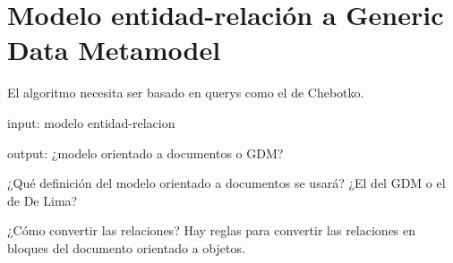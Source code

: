 \section{Modelo entidad-relación a Generic Data Metamodel}


El algoritmo necesita ser basado en querys como el de Chebotko.


input: modelo entidad-relacion


output: ¿modelo orientado a documentos o GDM?


¿Qué definición del modelo orientado a documentos se usará? ¿El del GDM o el de De Lima?


¿Cómo convertir las relaciones?
Hay reglas para convertir las relaciones en bloques del documento orientado a objetos.
